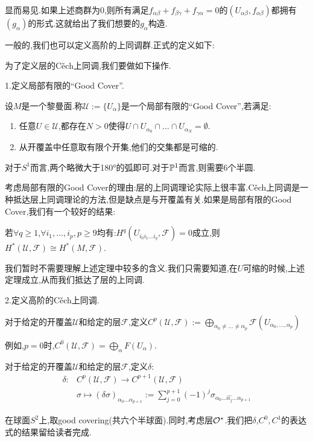 显而易见.如果上述商群为$0$,则所有满足$f_{\alpha\beta}+f_{\beta\gamma}+f_{\gamma\alpha}=0$的$(U_{\alpha\beta},f_{\alpha\beta})$都拥有$(g_\alpha)$的形式.这就给出了我们想要的$g_\alpha$构造.

一般的,我们也可以定义高阶的上同调群.正式的定义如下:

为了定义层的C\v{e}ch上同调,我们要做如下操作.

	1.定义局部有限的“Good Cover”.
   \begin{definition}
	设$M$是一个黎曼面.称$\mathcal{U}:=\{U_\alpha\}$是一个局部有限的“Good Cover”,若满足:
	\begin{enumerate}[(1)]
		\item 任意$U \in \mathcal{U}$,都存在$N>0$使得$U\cap U_{\alpha_0}\cap \dots \cap U_{\alpha_N}=\emptyset$.
		\item 从开覆盖中任意取有限个开集,他们的交集都是可缩的.
	\end{enumerate}
   \end{definition}
	
\begin{example}
	对于$S^1$而言,两个略微大于180°的弧即可.对于$\PP^1$而言,则需要6个半圆.
\end{example}
考虑局部有限的Good Cover的理由:层的上同调理论实际上很丰富.C\v{e}ch上同调是一种抵达层上同调理论的方法,但是缺点是与开覆盖有关.如果是局部有限的Good Cover,我们有一个较好的结果:
\begin{theorem}[Leray]
	若$\forall q\geq 1$,$\forall i_1,\dots,i_p,p\geq 9$均有:$H^q(U_{i_0 i_1\dots i_q},\mathcal{F})=0$成立,则$H^*(\mathcal{U},\mathcal{F})\cong H^*(M,\mathcal{F})$.
\end{theorem}

我们暂时不需要理解上述定理中较多的含义.我们只需要知道,在$U$可缩的时候,上述定理成立,从而我们抵达了层的上同调.

2.定义高阶的C\v{e}ch上同调.
\begin{definition}[$C^p$上链]
	对于给定的开覆盖$\mathcal{U}$和给定的层$\mathcal{F}$,定义$C^p(\mathcal{U},\mathcal{F}):=\bigoplus_{\alpha_0\neq \dots \neq \alpha_p}\mathcal{F}(U_{\alpha_0,\dots,\alpha_p})$
\end{definition}
例如,$p=0$时,$C^0(\mathcal{U},\mathcal{F})=\bigoplus_{\alpha}F(U_\alpha)$.


\begin{definition}
	对于给定的开覆盖$\mathcal{U}$和给定的层$\mathcal{F}$,定义$\delta$:
	\begin{align*}
		\delta:&C^p(\mathcal{U},\mathcal{F}) \to C^{p+1}(\mathcal{U},\mathcal{F}) \\
		&\sigma \mapsto (\delta \sigma)_{\alpha_0\dots\alpha_{p+1}}:=\sum_{j=0}^{p+1}(-1)^j \sigma_{\alpha_0\dots \hat{\alpha_j}\dots\alpha_{p+1}}
	\end{align*}
\end{definition}
\begin{example}[$\PP^1$]
	在球面$S^2$上,取good covering(共六个半球面).同时,考虑层$\mathcal{O}^*$.我们把$\delta$,$C^0,C^1$的表达式的结果留给读者完成.
\end{example}


